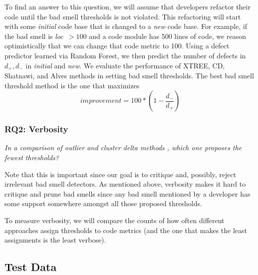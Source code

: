 \documentclass{sig-alternate}
\theoremstyle{break}
\begin{document}
\begin{itemize}
To find an answer to this question, we will assume that developers
refactor their code until the bad smell thresholds is not violated.
This refactoring will start with some {\em initial} code
base that is changed to a {\em new} code base. 
For example, if the bad smell is \mbox{{\em loc $>100$}} and a 
code module has 500 lines of code, we reason
optimistically that we can change that code metric
to 100.  
Using a defect
predictor learned via Random Forest, we then predict the
number of defects in $d_+,d_-$ in {\em initial} and {\em new}. We evaluate the performance of XTREE, CD, Shatnawi, and Alves methods in setting bad smell thresholds.
The best bad smell threshold method is the one that maximizes
\begin{equation}\label{eq:diff}
\mathit{improvement} = 100* \left(1 - \frac{ d_- }{ d_+}\right)
\end{equation}

\subsubsection{RQ2: Verbosity} 

{\em In a comparison of    outlier and cluster delta
methods , which one proposes the fewest thresholds?}

Note that this is important since our goal is to critique and, possibly,
reject irrelevant bad smell detectors. As mentioned above,
  verbosity makes it hard   to critique and prune bad smells
since any bad smell mentioned by a developer has some support
somewhere amongst all those proposed thresholds. 

To measure verbosity, we will compare the counts of how often
different approaches assign thresholds to code metrics
(and the one that makes the least assignments is the least verbose).
 



 
 
\subsection{Test Data}\label{sect:tesd}


\end{itemize}
\end{document}
